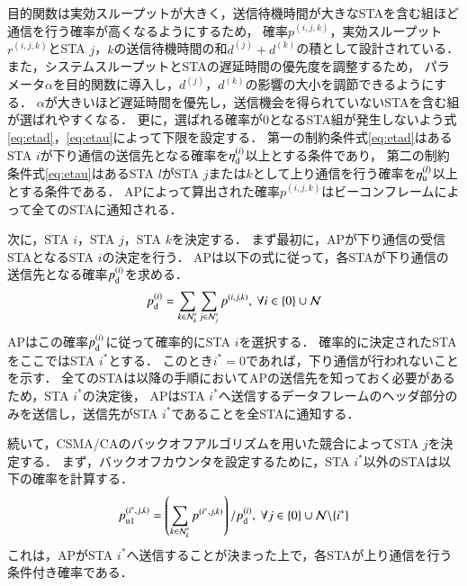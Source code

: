 \documentclass[master]{kuisthesis}		%
\newcommand{\pijk}{p^{(i,j,k)}}
\newcommand{\rijk}{r^{(i,j,k)}}
\newcommand{\mthnj}{{\mathcal N}'_j}
\newcommand{\mthnk}{{\mathcal N}'_k}
\begin{document}
			\par
			目的関数は実効スループットが大きく，送信待機時間が大きなSTAを含む組ほど通信を行う確率が高くなるようにするため，
			確率$\pijk$，実効スループット$\rijk$とSTA $j$，$k$の送信待機時間の和$d^{(j)}+d^{(k)}$の積として設計されている．
			また，システムスループットとSTAの遅延時間の優先度を調整するため，
			パラメータ$\alpha$を目的関数に導入し，$d^{(j)}$，$d^{(k)}$の影響の大小を調節できるようにする．
			$\alpha$が大きいほど遅延時間を優先し，送信機会を得られていないSTAを含む組が選ばれやすくなる．
			更に，選ばれる確率が0となるSTA組が発生しないよう式\eqref{eq:etad}，\eqref{eq:etau}によって下限を設定する．
			第一の制約条件式\eqref{eq:etad}はあるSTA $i$が下り通信の送信先となる確率を$\eta_{\rm d}^{(i)}$以上とする条件であり，
			第二の制約条件式\eqref{eq:etau}はあるSTA $l$がSTA $j$または$k$として上り通信を行う確率を$\eta_{\rm u}^{(l)}$以上とする条件である．
			APによって算出された確率$\pijk$はビーコンフレームによって全てのSTAに通知される．
			\par
			次に，STA $i$，STA $j$，STA $k$を決定する．
			まず最初に，APが下り通信の受信STAとなるSTA $i$の決定を行う．
			APは以下の式に従って，各STAが下り通信の送信先となる確率$p_{\rm d}^{(i)}$を求める．
			\begin{equation}
				p_{\rm d}^{(i)}= \sum_{k\in\mthnk}\sum_{j\in\mthnj}p^{(i,j,k)}, \ \forall i \in \{0\}\cup{\mathcal N}
			\end{equation}
			APはこの確率$p_{\rm d}^{(i)}$に従って確率的にSTA $i$を選択する．
			確率的に決定されたSTAをここではSTA $i^*$とする．
			このとき$i^*=0$であれば，下り通信が行われないことを示す．
			全てのSTAは以降の手順においてAPの送信先を知っておく必要があるため，STA $i^*$の決定後，
			APはSTA $i^*$へ送信するデータフレームのヘッダ部分のみを送信し，送信先がSTA $i^*$であることを全STAに通知する．
			\par
			続いて，CSMA/CAのバックオフアルゴリズムを用いた競合によってSTA $j$を決定する．
			まず，バックオフカウンタを設定するために，STA $i^*$以外のSTAは以下の確率を計算する．
			\begin{align}
				p_{\rm u1}^{(i^*,j,k)}=\left(\sum_{k\in\mthnk} p^{(i^*,j,k)}\right) / p_{\rm d}^{(i)},\ \forall j \in \{0\}\cup{\mathcal N}\backslash \{i^*\}
			\end{align}
			これは，APがSTA $i^*$へ送信することが決まった上で，各STAが上り通信を行う条件付き確率である．
\end{document}
